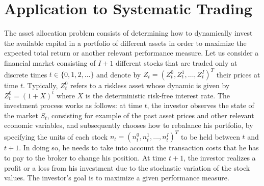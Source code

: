 \section{Application to Systematic Trading}
\label{sec:application_to_systematic_trading}

The asset allocation problem consists of determining how to dynamically invest
the available capital in a portfolio of different assets in order to maximize
the expected total return or another relevant performance measure. Let us
consider a financial market consisting of $I+1$ different stocks that are
traded only at discrete times $t \in \{0, 1, 2, \ldots\}$ and denote by
${Z}_t = {(Z_t^0, Z_t^1, \ldots, Z_t^I)}^T$ their prices at time $t$.
Typically, $Z_t^0$ refers to a riskless asset whose dynamic is given by $Z_t^0
= {(1 + X)}^t$ where $X$ is the deterministic risk-free interest rate. The
investment process works as follows: at time $t$, the investor observes the
state of the market $S_t$, consisting for example of the past asset prices and
other relevant economic variables, and subsequently chooses how to rebalance
his portfolio, by specifying the units of each stock ${n}_t = {(n_t^0 ,
n_t^1 , \ldots , n_t^I)}^T$ to be held between $t$ and $t+1$. In doing so, he
needs to take into account the transaction costs that he has to pay to the
broker to change his position.  At time $t+1$, the investor realizes a profit
or a loss from his investment due to the stochastic variation of the stock
values. The investor’s goal is to maximize a given performance measure.